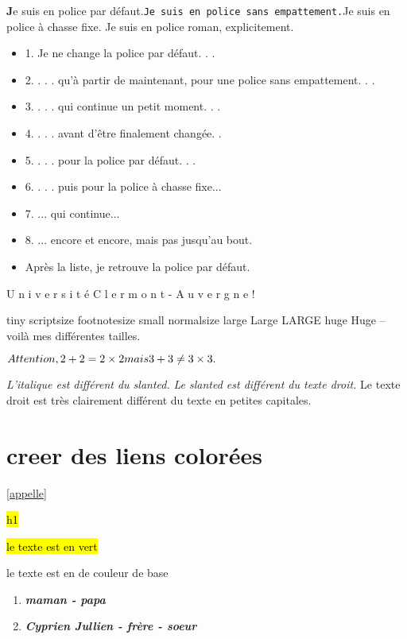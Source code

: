 \documentclass[french,titlepage] {article}
\newcommand{\strong}[1]{\mathversion{bold}{\textbf{#1}}}
\newcommand{\ecole}{\Huge U \huge n \LARGE i \Large v \large e \normalsize r \small s \footnotesize i \scriptsize t \tiny é
\Huge C \huge l \LARGE e \Large r \large m \normalsize o \small n \scriptsize t \tiny - \Huge A \huge u \LARGE v \Large e \large r \normalsize g \small n \footnotesize e \scriptsize !}
\newcommand{\texta}[1]{\tiny{#1}}
\newcommand{\textb}[1]{\scriptsize{#1}}
\newcommand{\textc}[1]{\footnotesize{#1}}
\newcommand{\textd}[1]{\small{#1}}
\newcommand{\texte}[1]{\normalsize{#1}}
\newcommand{\textf}[1]{\large{#1}}
\newcommand{\textg}[1]{\Large{#1}}
\newcommand{\texth}[1]{\LARGE{#1}}
\newcommand{\texti}[1]{\huge{#1}}
\newcommand{\textj}[1]{\Huge{#1}}
\newcommand{\surligne}[2][pink]{\sethlcolor{#1} \hl{#2}}
\newcommand {\myname} {Cyprien Jullien \xspace}
\newcommand{\mystyle}[2][]{{#1#2}}
\begin{document}
\fontsize{56}{1}\selectfont
\textbf
Je suis en police par défaut.\texttt{Je suis en police sans empattement.}\textsf{Je suis en police à
chasse fixe.} \textrm{Je suis en police roman, explicitement.}
\fontsize{1}{1}\selectfont
\begin{itemize}

\item 1. Je ne change la police par défaut. . .
\ttfamily
\item 2. . . . qu’à partir de maintenant, pour une police sans empattement. . .
\item 3. . . . qui continue un petit moment. . .
\item 4. . . . avant d’être finalement changée. . 
\rmfamily
\item 5. . . . pour la police par défaut. . .
\sffamily
\item 6. . . . puis pour la police à chasse fixe...
\item 7. ... qui continue...
\item 8. ... encore et encore, mais pas jusqu’au bout.
\rmfamily
\item Après la liste, je retrouve la police par défaut.
\end{itemize}

\ecole

\texta tiny
\textb scriptsize \textc footnotesize
\textd small \texte normalsize
\textf large \textg Large
\texth LARGE \texti huge
\textj Huge \normalsize – voilà mes différentes tailles.

\strong{$ 1+1$}

\textbf{
$ \mathversion{bold} Attention, 2 + 2 = 2 \times 2mais3 + 3 \ne 3 \times 3.$}


\textit{L’italique est différent du slanted.} 
\textsl {Le slanted est différent du texte droit.}
 \textup{Le texte
droit est très clairement différent du texte en petites capitales.}

\section{creer des liens colorées}

\href{appelle}
\ref{appelle}

\hl{ h1}

\surligne{le texte est en vert}

\surligne{}{le texte est en de couleur de base}


\begin{enumerate}



\item  \mystyle[\bfseries\slshape]{maman - papa}
\item \mystyle[\bfseries\slshape]{ \myname - frère - soeur}


\end{enumerate}
\end{document}

